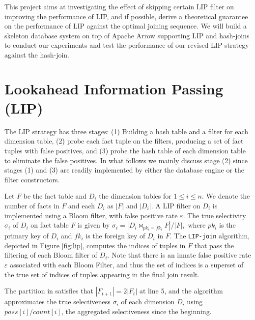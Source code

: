 \documentclass[10pt]{article}
\newcommand{\JOIN}{\bowtie}
\begin{document}
This project aims at investigating the effect of skipping certain LIP filter on improving the performance of LIP, and if possible, derive a theoretical guarantee on the performance of LIP against the optimal joining sequence. We will build a skeleton database system on top of Apache Arrow supporting LIP and hash-joins to conduct our experiments and test the performance of our revised LIP strategy against the hash-join.


\section{Lookahead Information Passing (LIP)}

The LIP strategy has three stages: (1) Building a hash table and a filter for each dimension table, (2) probe each fact tuple on the filters, producing a set of fact tuples with false positives, and (3) probe the hash table of each dimension table to eliminate the false positives. In what follows we mainly discuss stage (2) since stages (1) and (3) are readily implemented by either the database engine or the filter constructors.

Let $F$ be the fact table and $D_i$ the dimension tables for $1 \leq i \leq n$. We denote the number of facts in $F$ and each $D_i$ as $|F|$ and $|D_i|$. A LIP filter on $D_i$ is implemented using a Bloom filter, with false positive rate $\varepsilon$. The true selectivity $\sigma_i$ of $D_i$ on fact table $F$ is given by $\sigma_i = |D_i \JOIN_{pk_i = fk_i} F| / |F|,$ where $pk_i$ is the primary key of $D_i$ and $fk_i$ is the foreign key of $D_i$ in $F$. The \texttt{LIP-join} algorithm, depicted in Figure \ref{fig:lip}, computes the indices of tuples in $F$ that pass the filtering of each Bloom filter of $D_i$. Note that there is an innate false positive rate $\varepsilon$ associated with each Bloom Filter, and thus the set of indices is a superset of the true set of indices of tuples appearing in the final join result.

The partition in \cite{zhu2017looking} satisfies that $|F_{t+1}| = 2|F_{t}|$ at line 5, and the algorithm approximates the true selectiveness $\sigma_i$ of each dimension $D_i$ using $pass[i]/count[i]$, the aggregated selectiveness since the beginning.
\end{document}
